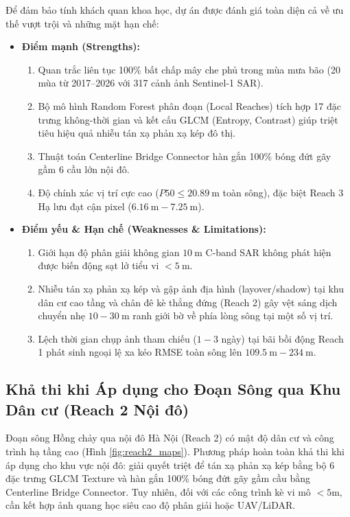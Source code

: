 \documentclass[11pt,a4paper]{article}
\begin{document}
Để đảm bảo tính khách quan khoa học, dự án được đánh giá toàn diện cả về ưu thế vượt trội và những mặt hạn chế:
\begin{itemize}
    \item \textbf{Điểm mạnh (Strengths):}
    \begin{enumerate}
        \item Quan trắc liên tục 100\% bất chấp mây che phủ trong mùa mưa bão (20 mùa từ 2017--2026 với 317 cảnh ảnh Sentinel-1 SAR).
        \item Bộ mô hình Random Forest phân đoạn (Local Reaches) tích hợp 17 đặc trưng không-thời gian và kết cấu GLCM (Entropy, Contrast) giúp triệt tiêu hiệu quả nhiễu tán xạ phản xạ kép đô thị.
        \item Thuật toán Centerline Bridge Connector hàn gắn 100\% bóng đứt gãy gầm 6 cầu lớn nội đô.
        \item Độ chính xác vị trí cực cao ($P50 \le 20.89~\text{m}$ toàn sông), đặc biệt Reach 3 Hạ lưu đạt cận pixel ($6.16~\text{m} - 7.25~\text{m}$).
    \end{enumerate}
    \item \textbf{Điểm yếu \& Hạn chế (Weaknesses \& Limitations):}
    \begin{enumerate}
        \item Giới hạn độ phân giải không gian $10~\text{m}$ C-band SAR không phát hiện được biến động sạt lở tiểu vi $< 5~\text{m}$.
        \item Nhiễu tán xạ phản xạ kép và gập ảnh địa hình (layover/shadow) tại khu dân cư cao tầng và chân đê kè thẳng đứng (Reach 2) gây vệt sáng dịch chuyển nhẹ $10 - 30~\text{m}$ ranh giới bờ về phía lòng sông tại một số vị trí.
        \item Lệch thời gian chụp ảnh tham chiếu ($1 - 3$ ngày) tại bãi bồi động Reach 1 phát sinh ngoại lệ xa kéo RMSE toàn sông lên $109.5~\text{m} - 234~\text{m}$.
    \end{enumerate}
\end{itemize}

\subsection{Khả thi khi Áp dụng cho Đoạn Sông qua Khu Dân cư (Reach 2 Nội đô)}
Đoạn sông Hồng chảy qua nội đô Hà Nội (Reach 2) có mật độ dân cư và công trình hạ tầng cao (Hình \ref{fig:reach2_maps}). Phương pháp hoàn toàn khả thi khi áp dụng cho khu vực nội đô: giải quyết triệt để tán xạ phản xạ kép bằng bộ 6 đặc trưng GLCM Texture và hàn gắn 100\% bóng đứt gãy gầm cầu bằng Centerline Bridge Connector. Tuy nhiên, đối với các công trình kè vi mô $<5\text{m}$, cần kết hợp ảnh quang học siêu cao độ phân giải hoặc UAV/LiDAR.
\end{document}
